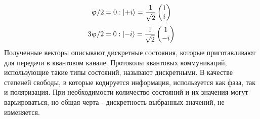 \begin{equation}
  \upvarphi/2 = 0 : \lvert+i\rangle= \frac{1}{\sqrt{2}} \begin{pmatrix} 1 \\ i \end{pmatrix}
\end{equation}\label{eq:pi/2 phase vector}
\begin{equation}
  3\upvarphi/2 = 0 : \lvert-i\rangle= \frac{1}{\sqrt{2}} \begin{pmatrix} 1 \\ -i \end{pmatrix}
\end{equation}\label{eq:3pi/2 phase vector}
Полученные векторы описывают дискретные состояния, которые приготавливают для передачи в квантовом канале. Протоколы квантовых коммуникаций, использующие такие типы состояний, называют дискретными. В качестве степеней свободы, в которые кодируется информация, используется как фаза, так и поляризация. При необходимости количество состояний и их значения могут варьироваться, но общая черта - дискретность выбранных значений, не изменяется.
